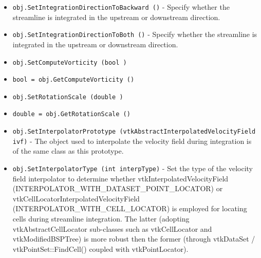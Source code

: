 \begin{itemize}
\item  \verb|obj.SetIntegrationDirectionToBackward ()| -  Specify whether the streamline is integrated in the upstream or
 downstream direction.

\item  \verb|obj.SetIntegrationDirectionToBoth ()| -  Specify whether the streamline is integrated in the upstream or
 downstream direction.

\item  \verb|obj.SetComputeVorticity (bool )|

\item  \verb|bool = obj.GetComputeVorticity ()|

\item  \verb|obj.SetRotationScale (double )|

\item  \verb|double = obj.GetRotationScale ()|

\item  \verb|obj.SetInterpolatorPrototype (vtkAbstractInterpolatedVelocityField ivf)| -  The object used to interpolate the velocity field during
 integration is of the same class as this prototype.

\item  \verb|obj.SetInterpolatorType (int interpType)| -  Set the type of the velocity field interpolator to determine whether
 vtkInterpolatedVelocityField (INTERPOLATOR\_WITH\_DATASET\_POINT\_LOCATOR) or
 vtkCellLocatorInterpolatedVelocityField (INTERPOLATOR\_WITH\_CELL\_LOCATOR)
 is employed for locating cells during streamline integration. The latter
 (adopting vtkAbstractCellLocator sub-classes such as vtkCellLocator and
 vtkModifiedBSPTree) is more robust then the former (through vtkDataSet /
 vtkPointSet::FindCell() coupled with vtkPointLocator).

\end{itemize}
